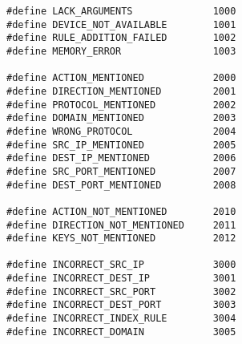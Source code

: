 \begin{lstlisting}[caption = {errors.c}]
#define LACK_ARGUMENTS              1000
#define DEVICE_NOT_AVAILABLE        1001
#define RULE_ADDITION_FAILED        1002
#define MEMORY_ERROR                1003

#define ACTION_MENTIONED            2000
#define DIRECTION_MENTIONED         2001
#define PROTOCOL_MENTIONED          2002
#define DOMAIN_MENTIONED            2003
#define WRONG_PROTOCOL              2004
#define SRC_IP_MENTIONED            2005
#define DEST_IP_MENTIONED           2006
#define SRC_PORT_MENTIONED          2007
#define DEST_PORT_MENTIONED         2008

#define ACTION_NOT_MENTIONED        2010
#define DIRECTION_NOT_MENTIONED     2011
#define KEYS_NOT_MENTIONED          2012

#define INCORRECT_SRC_IP            3000
#define INCORRECT_DEST_IP           3001
#define INCORRECT_SRC_PORT          3002
#define INCORRECT_DEST_PORT         3003
#define INCORRECT_INDEX_RULE        3004
#define INCORRECT_DOMAIN            3005
\end{lstlisting}
	
	